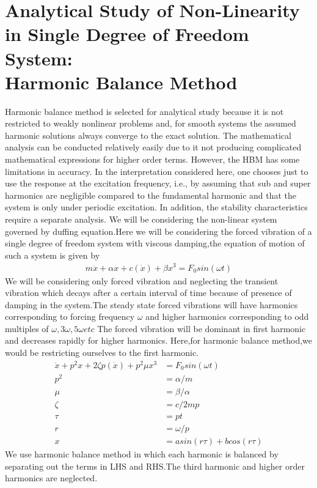 \chapter{Analytical Study of Non-Linearity in Single Degree of Freedom System:\\Harmonic Balance Method}
Harmonic balance method is selected for analytical study because it is not restricted to weakly nonlinear problems and, for smooth systems the assumed harmonic solutions always converge to the exact solution. The mathematical analysis can be conducted relatively easily due to it not producing complicated mathematical expressions for higher order terms. However, the HBM has some limitations in accuracy. In the interpretation considered here, one chooses just to use the response at the excitation frequency, i.e., by assuming that sub and super harmonics are negligible compared to the fundamental harmonic and that the system is only under periodic excitation. In addition, the stability characteristics require a separate analysis. 
We will be considering the non-linear system governed by duffing equation.Here we will be considering the forced vibration of a single degree of freedom system with viscous damping,the equation of motion of such a system is given by
\begin{align}
m\ddot{x}+\alpha x+c(\dot{x})+\beta x^3=F_0sin(\omega t)
\end{align}
We will be considering only forced vibration and neglecting the transient vibration which decays after a certain interval of time because of presence of damping in the system.The steady state forced vibrations will have harmonics corresponding to forcing frequency $\omega$ and higher harmonics corresponding to odd multiples of $\omega ,3\omega , 5\omega etc$ The forced vibration will be dominant in first harmonic and decreases rapidly for higher harmonics.
Here,for harmonic balance method,we would be restricting ourselves to the first harmonic.
\begin{align}
\ddot{x}+p^2 x+2 \zeta p (\dot{x})+p^2 \mu x^3 &=F_0sin(\omega t)\\
p^2 &= \alpha /m \\
\mu & = \beta / \alpha \\
\zeta &=c/2mp \\
\tau &= pt \\
r &= \omega /p \\
x &= asin(r\tau )+bcos(r\tau)
\end{align}
We use harmonic balance method in which each harmonic is balanced by separating out the terms in LHS and RHS.The third harmonic and higher order harmonics are neglected.
